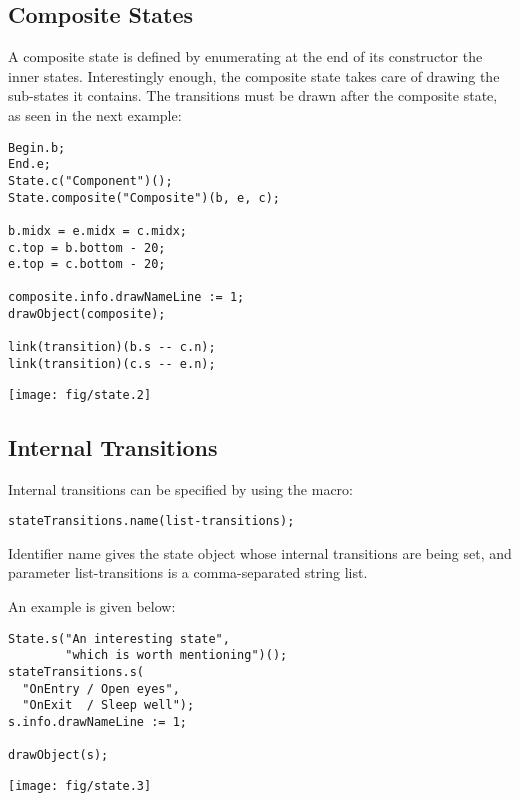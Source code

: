 \documentclass{article}
\newcommand{\code}{\ttfamily}
\begin{document}
\subsection{Composite States}
\label{composite-states}

A composite state is defined by enumerating at the end of its constructor the inner
states. Interestingly enough, the composite state takes care of drawing the sub-states it
contains. The transitions must be drawn after the composite state, as seen in the
next example:

\begin{multicols}{2}
\begin{verbatim}
Begin.b;
End.e;
State.c("Component")();
State.composite("Composite")(b, e, c);

b.midx = e.midx = c.midx;
c.top = b.bottom - 20;
e.top = c.bottom - 20;

composite.info.drawNameLine := 1;
drawObject(composite);

link(transition)(b.s -- c.n);
link(transition)(c.s -- e.n);
\end{verbatim}
\columnbreak
\hspace{1cm}\texttt{[image: fig/state.2]}
\end{multicols}

\subsection{Internal Transitions}

Internal transitions can be specified by using the macro:
\begin{verbatim}
stateTransitions.name(list-transitions);
\end{verbatim}

Identifier {\code name} gives the state object whose internal transitions are being set,
and parameter {\code list-transitions} is a comma-separated string list.


An example is given below:

\begin{multicols}{2}
\begin{verbatim}
State.s("An interesting state",
        "which is worth mentioning")();
stateTransitions.s(
  "OnEntry / Open eyes",
  "OnExit  / Sleep well");
s.info.drawNameLine := 1;

drawObject(s);
\end{verbatim}
\columnbreak
\hspace{1cm}\texttt{[image: fig/state.3]}
\end{multicols}
\end{document}
